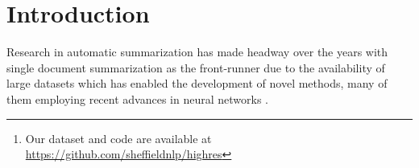 \documentclass[11pt,a4paper]{article}
\newcommand\highres{\textsc{HighRES}}
\begin{document}
\begin{abstract}
  There has been substantial progress in summarization research enabled by the availability of novel, often large-scale, datasets and recent advances on neural network-based approaches. 
  However, manual evaluation of the system generated summaries is inconsistent due to the difficulty the task poses to human non-expert readers.
  To address this issue, we propose a novel approach for manual evaluation,  \textsc{High}light-based \textsc{R}eference-less \textsc{E}valuation of \textsc{S}ummarization (\highres), in which summaries are assessed by multiple annotators against the source document via manually highlighted salient content in the latter. Thus summary assessment on the source document by human judges is facilitated,  while the highlights can be used for evaluating multiple systems.
   To validate our approach we employ crowd-workers to augment with highlights a recently proposed dataset and compare two state-of-the-art systems. We demonstrate that \highres{} improves inter-annotator agreement in comparison to using the source document directly, while they help emphasize differences among systems that would be ignored under other evaluation approaches \footnote{Our dataset and code are available at \url{https://github.com/sheffieldnlp/highres}}.
\end{abstract}



\section{Introduction}

Research in automatic summarization has made headway over the years with single document summarization as the front-runner due to the availability of large datasets \citep{Sandhaus2008,Hermann2015,narayan18xsum} which has enabled the development of novel methods, many of them employing recent advances in neural networks 
\citep[\textit{inter alia}]{See2017,Narayan2018,Pasunuru2018a}. 
\end{document}
